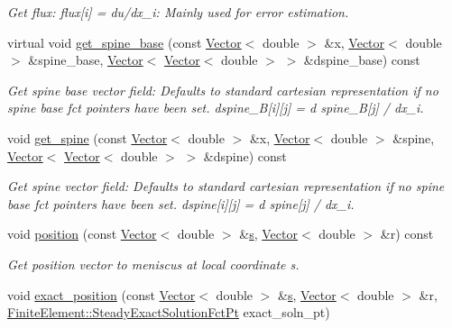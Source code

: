 \begin{DoxyCompactItemize}
\begin{DoxyCompactList}\small\item\em Get flux\+: flux\mbox{[}i\mbox{]} = du/dx\+\_\+i\+: Mainly used for error estimation. \end{DoxyCompactList}\item 
virtual void \hyperlink{classoomph_1_1YoungLaplaceEquations_a4f9bb4d4617839296397c07cb2f2349c}{get\+\_\+spine\+\_\+base} (const \hyperlink{classoomph_1_1Vector}{Vector}$<$ double $>$ \&x, \hyperlink{classoomph_1_1Vector}{Vector}$<$ double $>$ \&spine\+\_\+base, \hyperlink{classoomph_1_1Vector}{Vector}$<$ \hyperlink{classoomph_1_1Vector}{Vector}$<$ double $>$ $>$ \&dspine\+\_\+base) const
\begin{DoxyCompactList}\small\item\em Get spine base vector field\+: Defaults to standard cartesian representation if no spine base fct pointers have been set. dspine\+\_\+B\mbox{[}i\mbox{]}\mbox{[}j\mbox{]} = d spine\+\_\+B\mbox{[}j\mbox{]} / dx\+\_\+i. \end{DoxyCompactList}\item 
void \hyperlink{classoomph_1_1YoungLaplaceEquations_a08376fdfe31361bee2ba0d21f9b132ec}{get\+\_\+spine} (const \hyperlink{classoomph_1_1Vector}{Vector}$<$ double $>$ \&x, \hyperlink{classoomph_1_1Vector}{Vector}$<$ double $>$ \&spine, \hyperlink{classoomph_1_1Vector}{Vector}$<$ \hyperlink{classoomph_1_1Vector}{Vector}$<$ double $>$ $>$ \&dspine) const
\begin{DoxyCompactList}\small\item\em Get spine vector field\+: Defaults to standard cartesian representation if no spine base fct pointers have been set. dspine\mbox{[}i\mbox{]}\mbox{[}j\mbox{]} = d spine\mbox{[}j\mbox{]} / dx\+\_\+i. \end{DoxyCompactList}\item 
void \hyperlink{classoomph_1_1YoungLaplaceEquations_ab1b3d09214a0985a331564135fe14053}{position} (const \hyperlink{classoomph_1_1Vector}{Vector}$<$ double $>$ \&\hyperlink{cfortran_8h_ab7123126e4885ef647dd9c6e3807a21c}{s}, \hyperlink{classoomph_1_1Vector}{Vector}$<$ double $>$ \&r) const
\begin{DoxyCompactList}\small\item\em Get position vector to meniscus at local coordinate s. \end{DoxyCompactList}\item 
void \hyperlink{classoomph_1_1YoungLaplaceEquations_a948eaebd24c03d70bf1a6d2da775b008}{exact\+\_\+position} (const \hyperlink{classoomph_1_1Vector}{Vector}$<$ double $>$ \&\hyperlink{cfortran_8h_ab7123126e4885ef647dd9c6e3807a21c}{s}, \hyperlink{classoomph_1_1Vector}{Vector}$<$ double $>$ \&r, \hyperlink{classoomph_1_1FiniteElement_a690fd33af26cc3e84f39bba6d5a85202}{Finite\+Element\+::\+Steady\+Exact\+Solution\+Fct\+Pt} exact\+\_\+soln\+\_\+pt)

\end{DoxyCompactItemize}
